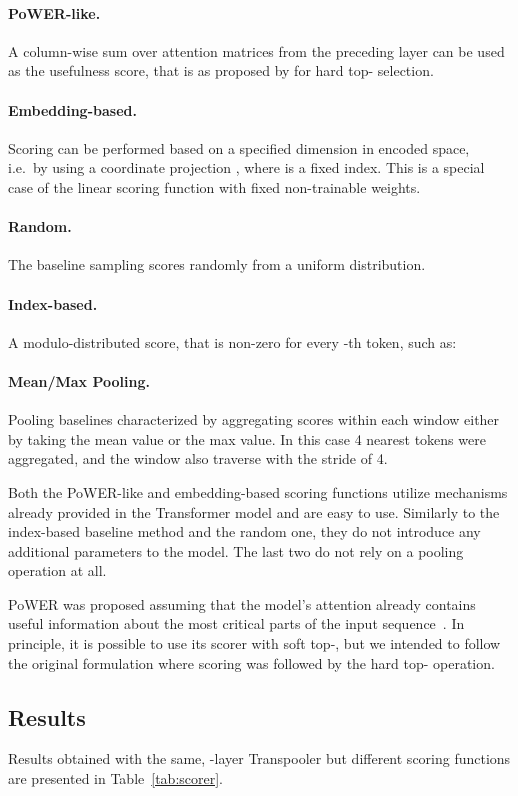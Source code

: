 \documentclass{article}
\begin{document}
\paragraph{PoWER-like.} 
A column-wise sum over attention matrices  from the preceding layer can be used as the usefulness score, that is  as proposed by \citet{pmlr-v119-goyal20a} for hard top- selection.
\paragraph{Embedding-based.} 
Scoring can be performed based on a specified dimension in encoded space, i.e.\ by using a coordinate projection , where  is a fixed index. This is a special case of the linear scoring function with fixed non-trainable weights.
\paragraph{Random.} The baseline sampling scores randomly from a uniform distribution.
\paragraph{Index-based.} A modulo-distributed score, that is non-zero for every -th token, such as:

\paragraph{Mean/Max Pooling.}
Pooling baselines characterized by aggregating scores within each window either by taking the mean value or the max value. In this case 4 nearest tokens were aggregated, and the window also traverse with the stride of 4.

Both the PoWER-like and embedding-based scoring functions utilize mechanisms already provided in the Transformer model and are easy to use. Similarly to the index-based baseline method and the random one, they do not introduce any additional parameters to the model. The last two do not rely on a pooling operation at all. 


PoWER was proposed assuming that the model's attention already contains useful information about the most critical parts of the input sequence~\citep{goyal2017continuous}. In principle, it is  possible to use its scorer with soft top-, but we intended to follow the original formulation where scoring was followed by the hard top- operation. 


\subsection{Results} Results obtained with the same, -layer Transpooler but different scoring functions are presented in Table~\ref{tab:scorer}.
\end{document}
